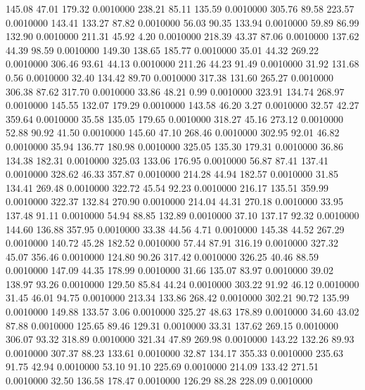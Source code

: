  145.08   47.01  179.32   0.0010000
 238.21   85.11  135.59   0.0010000
 305.76   89.58  223.57   0.0010000
 143.41  133.27   87.82   0.0010000
  56.03   90.35  133.94   0.0010000
  59.89   86.99  132.90   0.0010000
 211.31   45.92    4.20   0.0010000
 218.39   43.37   87.06   0.0010000
 137.62   44.39   98.59   0.0010000
 149.30  138.65  185.77   0.0010000
  35.01   44.32  269.22   0.0010000
 306.46   93.61   44.13   0.0010000
 211.26   44.23   91.49   0.0010000
  31.92  131.68    0.56   0.0010000
  32.40  134.42   89.70   0.0010000
 317.38  131.60  265.27   0.0010000
 306.38   87.62  317.70   0.0010000
  33.86   48.21    0.99   0.0010000
 323.91  134.74  268.97   0.0010000
 145.55  132.07  179.29   0.0010000
 143.58   46.20    3.27   0.0010000
  32.57   42.27  359.64   0.0010000
  35.58  135.05  179.65   0.0010000
 318.27   45.16  273.12   0.0010000
  52.88   90.92   41.50   0.0010000
 145.60   47.10  268.46   0.0010000
 302.95   92.01   46.82   0.0010000
  35.94  136.77  180.98   0.0010000
 325.05  135.30  179.31   0.0010000
  36.86  134.38  182.31   0.0010000
 325.03  133.06  176.95   0.0010000
  56.87   87.41  137.41   0.0010000
 328.62   46.33  357.87   0.0010000
 214.28   44.94  182.57   0.0010000
  31.85  134.41  269.48   0.0010000
 322.72   45.54   92.23   0.0010000
 216.17  135.51  359.99   0.0010000
 322.37  132.84  270.90   0.0010000
 214.04   44.31  270.18   0.0010000
  33.95  137.48   91.11   0.0010000
  54.94   88.85  132.89   0.0010000
  37.10  137.17   92.32   0.0010000
 144.60  136.88  357.95   0.0010000
  33.38   44.56    4.71   0.0010000
 145.38   44.52  267.29   0.0010000
 140.72   45.28  182.52   0.0010000
  57.44   87.91  316.19   0.0010000
 327.32   45.07  356.46   0.0010000
 124.80   90.26  317.42   0.0010000
 326.25   40.46   88.59   0.0010000
 147.09   44.35  178.99   0.0010000
  31.66  135.07   83.97   0.0010000
  39.02  138.97   93.26   0.0010000
 129.50   85.84   44.24   0.0010000
 303.22   91.92   46.12   0.0010000
  31.45   46.01   94.75   0.0010000
 213.34  133.86  268.42   0.0010000
 302.21   90.72  135.99   0.0010000
 149.88  133.57    3.06   0.0010000
 325.27   48.63  178.89   0.0010000
  34.60   43.02   87.88   0.0010000
 125.65   89.46  129.31   0.0010000
  33.31  137.62  269.15   0.0010000
 306.07   93.32  318.89   0.0010000
 321.34   47.89  269.98   0.0010000
 143.22  132.26   89.93   0.0010000
 307.37   88.23  133.61   0.0010000
  32.87  134.17  355.33   0.0010000
 235.63   91.75   42.94   0.0010000
  53.10   91.10  225.69   0.0010000
 214.09  133.42  271.51   0.0010000
  32.50  136.58  178.47   0.0010000
 126.29   88.28  228.09   0.0010000
